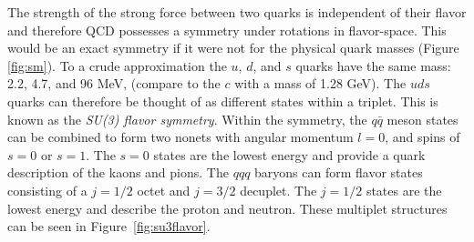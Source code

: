 The strength of the strong force between two quarks is independent of their flavor and therefore QCD possesses a symmetry under rotations in flavor-space. This would be an exact symmetry if it were not for the physical quark masses (Figure \ref{fig:sm}). To a crude approximation the $u$, $d$, and $s$ quarks have the same mass: 2.2, 4.7, and 96 MeV, (compare to the $c$ with a mass of 1.28 GeV). The $uds$ quarks can therefore be thought of as different states within a triplet. This is known as the \textit{SU(3) flavor symmetry}. Within the symmetry, the $q\bar{q }$ meson states can be combined to form two nonets with angular momentum $l=0$, and spins of $s=0$ or $s=1$. The $s=0$ states are the lowest energy and provide a quark description of the kaons and pions. The $qqq$ baryons can form flavor states consisting of a $j=1/2$ octet and $j=3/2$ decuplet. The $j=1/2$ states are the lowest energy and describe the proton and neutron. These multiplet structures can be seen in Figure~\ref{fig:su3flavor}. 

